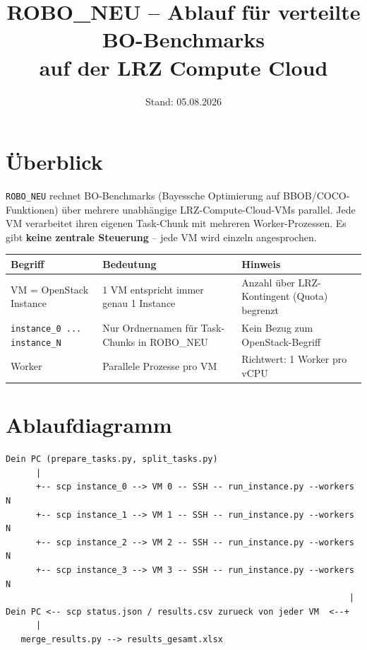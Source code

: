 \documentclass[11pt,a4paper]{article}
\title{\textbf{ROBO\_NEU -- Ablauf f\"ur verteilte BO-Benchmarks\\auf der LRZ Compute Cloud}}
\author{}
\date{Stand: 05.08.2026}
\begin{document}
\maketitle
\vspace{-1.5em}
\noindent\hrulefill

\section{\"Uberblick}

\texttt{ROBO\_NEU} rechnet BO-Benchmarks (Bayessche Optimierung auf BBOB/COCO-Funktionen)
\"uber mehrere unabh\"angige LRZ-Compute-Cloud-VMs parallel. Jede VM verarbeitet ihren
eigenen Task-Chunk mit mehreren Worker-Prozessen. Es gibt \textbf{keine zentrale
Steuerung} -- jede VM wird einzeln angesprochen.

\begin{table}[h]
\centering
\begin{tabular}{p{3.2cm} p{5.2cm} p{5.2cm}}
\toprule
\textbf{Begriff} & \textbf{Bedeutung} & \textbf{Hinweis} \\
\midrule
VM = OpenStack Instance & 1 VM entspricht immer genau 1 Instance & Anzahl \"uber LRZ-Kontingent (Quota) begrenzt \\
\texttt{instance\_0 ... instance\_N} & Nur Ordnernamen f\"ur Task-Chunks in ROBO\_NEU & Kein Bezug zum OpenStack-Begriff \\
Worker & Parallele Prozesse pro VM & Richtwert: 1 Worker pro vCPU \\
\bottomrule
\end{tabular}
\end{table}

\section{Ablaufdiagramm}

\begin{lstlisting}
Dein PC (prepare_tasks.py, split_tasks.py)
      |
      +-- scp instance_0 --> VM 0 -- SSH -- run_instance.py --workers N
      +-- scp instance_1 --> VM 1 -- SSH -- run_instance.py --workers N
      +-- scp instance_2 --> VM 2 -- SSH -- run_instance.py --workers N
      +-- scp instance_3 --> VM 3 -- SSH -- run_instance.py --workers N
                                                                    |
Dein PC <-- scp status.json / results.csv zurueck von jeder VM  <--+
      |
   merge_results.py --> results_gesamt.xlsx
\end{lstlisting}
\end{document}

